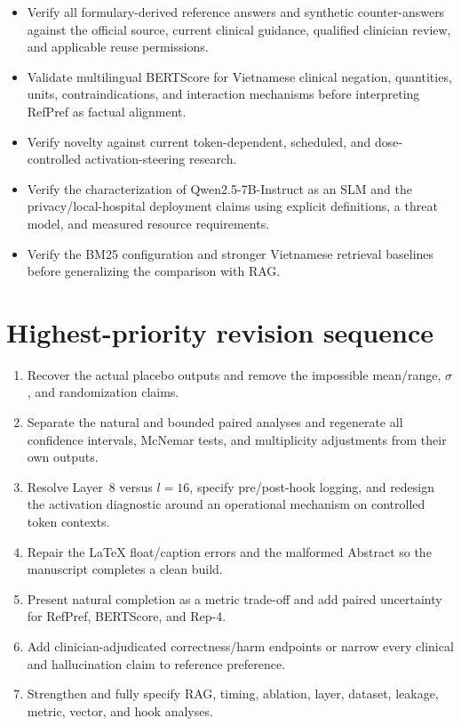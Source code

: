 \documentclass[11pt]{article}
\begin{document}
\begin{itemize}
    \item Verify all formulary-derived reference answers and synthetic counter-answers against the official source, current clinical guidance, qualified clinician review, and applicable reuse permissions.
    \item Validate multilingual BERTScore for Vietnamese clinical negation, quantities, units, contraindications, and interaction mechanisms before interpreting RefPref as factual alignment.
    \item Verify novelty against current token-dependent, scheduled, and dose-controlled activation-steering research.
    \item Verify the characterization of Qwen2.5-7B-Instruct as an SLM and the privacy/local-hospital deployment claims using explicit definitions, a threat model, and measured resource requirements.
    \item Verify the BM25 configuration and stronger Vietnamese retrieval baselines before generalizing the comparison with RAG.
\end{itemize}

\section*{Highest-priority revision sequence}

\begin{enumerate}
    \item Recover the actual placebo outputs and remove the impossible mean/range, $\sigma$, and randomization claims.
    \item Separate the natural and bounded paired analyses and regenerate all confidence intervals, McNemar tests, and multiplicity adjustments from their own outputs.
    \item Resolve Layer~8 versus $l=16$, specify pre/post-hook logging, and redesign the activation diagnostic around an operational mechanism on controlled token contexts.
    \item Repair the LaTeX float/caption errors and the malformed Abstract so the manuscript completes a clean build.
    \item Present natural completion as a metric trade-off and add paired uncertainty for RefPref, BERTScore, and Rep-4.
    \item Add clinician-adjudicated correctness/harm endpoints or narrow every clinical and hallucination claim to reference preference.
    \item Strengthen and fully specify RAG, timing, ablation, layer, dataset, leakage, metric, vector, and hook analyses.
\end{enumerate}
\end{document}
